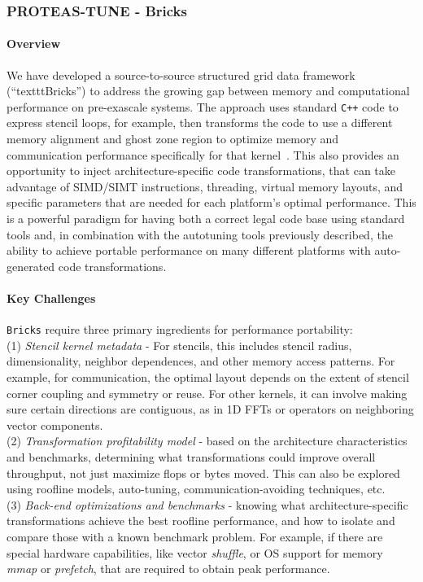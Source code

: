 \subsubsection{ PROTEAS-TUNE - Bricks} 

\paragraph{Overview}
We have developed a source-to-source structured grid data framework (``texttt{Bricks}'')
  to address the growing gap between memory and computational performance 
  on pre-exascale systems.
The approach uses standard \texttt{C++} code to express stencil loops, for example, 
  then transforms the code to use a different memory alignment and ghost
  zone region to optimize memory and communication performance specifically
  for that kernel~\cite{P3HPC_Bricks,zhao2019,zhaoMPI2019}.
This also provides an opportunity to inject architecture-specific code
  transformations, that can take advantage of SIMD/SIMT instructions, threading,
  virtual memory layouts, and specific parameters that are needed
  for each platform’s optimal performance.
This is a powerful paradigm for having both a correct legal code base 
  using standard tools and, in combination with the autotuning tools previously described,
  the ability to achieve portable performance on many different 
  platforms with auto-generated code transformations.

\paragraph{Key Challenges}
\texttt{Bricks} require three primary ingredients for performance portability:
\\
(1) \textit{Stencil kernel metadata} - For stencils, this includes stencil radius,
  dimensionality, neighbor dependences, and other memory access patterns.
  For example, for communication, the optimal layout depends on the
  extent of stencil corner coupling and symmetry or reuse.
For other kernels, it can involve making sure certain directions are contiguous,
  as in 1D FFTs or operators on neighboring vector components.
\\
(2) \textit{Transformation profitability model} - based on the architecture
  characteristics and benchmarks, determining what transformations could
  improve overall throughput, not just maximize flops or bytes moved. 
  This can also be explored using roofline models, auto-tuning, 
  communication-avoiding techniques, etc.
\\
(3) \textit{Back-end optimizations and benchmarks} - knowing what 
  architecture-specific transformations achieve the best roofline performance, 
  and how to isolate and compare those with a known benchmark problem. 
For example, if there
  are special hardware capabilities, like vector \textit{shuffle}, 
  or OS support for memory \textit{mmap} or \textit{prefetch}, that are required to obtain
  peak performance.


